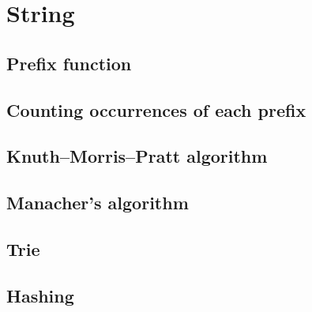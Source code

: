 \section{String}

\subsection{Prefix function}

\subsection{Counting occurrences of each prefix}

\subsection{Knuth–Morris–Pratt algorithm}

\subsection{Manacher's algorithm}

\subsection{Trie}

\subsection{Hashing}
